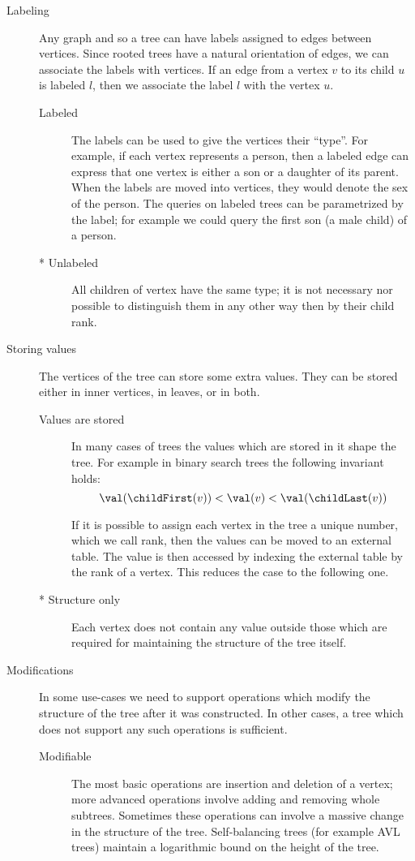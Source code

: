 \begin{description}
	\item[Labeling]
	Any graph and so a tree can have labels assigned to edges between vertices.
	Since rooted trees have a natural orientation of edges, we can associate the labels with vertices.
	If an edge from a vertex $v$ to its child $u$ is labeled $l$, then we associate the label $l$ with the vertex $u$.
	\begin{description}
		\item[Labeled]
		The labels can be used to give the vertices their ``type''.
		For example, if each vertex represents a person, then a labeled edge can express that one vertex is either a son or a daughter of its parent.
		When the labels are moved into vertices, they would denote the sex of the person.
		The queries on labeled trees can be parametrized by the label; for example we could query the first son (a male child) of a person.
		
		\item[* Unlabeled]
		All children of vertex have the same type; it is not necessary nor possible to distinguish them in any other way then by their child rank.
	\end{description}
	
	\item[Storing values]
	The vertices of the tree can store some extra values.
	They can be stored either in inner vertices, in leaves, or in both. 
	
	\begin{description}
		\item[Values are stored]
		In many cases of trees the values which are stored in it shape the tree.
		For example in binary search trees the following invariant holds:
		$$ \val(\childFirst(v)) < \val(v) < \val(\childLast(v)) $$
		
		If it is possible to assign each vertex in the tree a unique number, which we call rank, then the values can be moved to an external table.
		The value is then accessed by indexing the external table by the rank of a vertex.
		This reduces the case to the following one.
		
		\item[* Structure only]
		Each vertex does not contain any value outside those which are required for maintaining the structure of the tree itself.
		
	\end{description}
	
	\item[Modifications]
	In some use-cases we need to support operations which modify the structure of the tree after it was constructed.
	In other cases, a tree which does not support any such operations is sufficient.
	\begin{description}
		\item[Modifiable]
		The most basic operations are insertion and deletion of a vertex; more advanced operations involve adding and removing whole subtrees.
		Sometimes these operations can involve a massive change in the structure of the tree.
		Self-balancing trees (for example AVL trees) maintain a logarithmic bound on the height of the tree.
		

\end{description}
\end{description}

